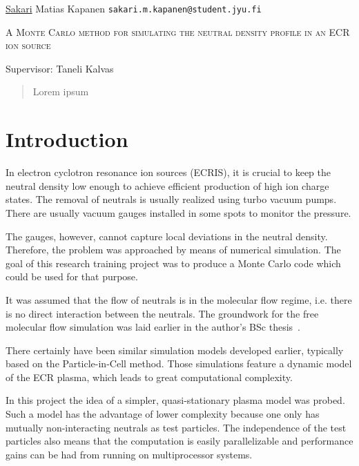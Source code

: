 \documentclass[a4paper,twoside,12pt]{article}
\begin{document}
\onehalfspacing%
\thispagestyle{empty}
\begin{flushleft}
 \underline{Sakari} Matias Kapanen\hfill
 \texttt{sakari.m.kapanen@student.jyu.fi}
\end{flushleft}
\vfill
\begin{center}
\textsc{\LARGE A Monte Carlo method for simulating the neutral density profile in an ECR ion source}
\end{center}
\vfill
Supervisor: Taneli Kalvas\\
\vfill
\begin{abstract}
 \noindent
    Lorem ipsum
\end{abstract}
\clearpage%

\setlength{\parindent}{0pt}
\setlength{\parskip}{12pt}

\setcounter{page}{1}

\section{Introduction}
In electron cyclotron resonance ion sources (ECRIS), it is crucial to keep the neutral density low enough to achieve efficient production of high ion charge states. The removal of neutrals is usually realized using turbo vacuum pumps. There are usually vacuum gauges installed in some spots to monitor the pressure.

The gauges, however, cannot capture local deviations in the neutral density. Therefore, the problem was approached by means of numerical simulation. The goal of this research training project was to produce a Monte Carlo code which could be used for that purpose.

It was assumed that the flow of neutrals is in the molecular flow regime, i.e. there is no direct interaction between the neutrals. The groundwork for the free molecular flow simulation was laid earlier in the author's BSc thesis~\cite{kapanen:bsc}.

There certainly have been similar simulation models developed earlier, typically based on the Particle-in-Cell method. Those simulations feature a dynamic model of the ECR plasma, which leads to great computational complexity.

In this project the idea of a simpler, quasi-stationary plasma model was probed. Such a model has the advantage of lower complexity because one only has mutually non-interacting neutrals as test particles. The independence of the test particles also means that the computation is easily parallelizable and performance gains can be had from running on multiprocessor systems.
\end{document}
